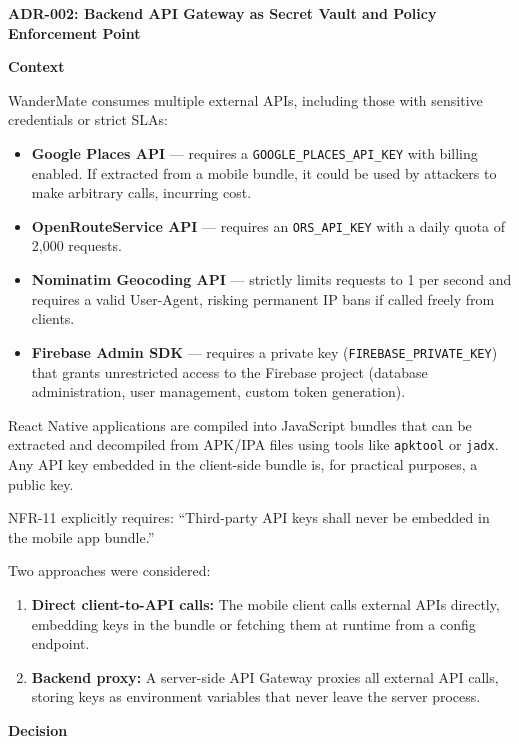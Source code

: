 \documentclass[12pt, a4paper]{article}
\newcommand{\code}[1]{\texttt{\small #1}}
\newcommand{\reqid}[1]{\textsc{\small #1}}
\begin{document}
\begin{tcolorbox}[adrbox]

\textbf{\large ADR-002: Backend API Gateway as Secret Vault and Policy Enforcement Point}

\vspace{0.6em}
\textbf{Context}

WanderMate consumes multiple external APIs, including those with sensitive credentials or strict SLAs:
\begin{itemize}
  \item \textbf{Google Places API} --- requires a \code{GOOGLE\_PLACES\_API\_KEY} with billing enabled. If extracted from a mobile bundle, it could be used by attackers to make arbitrary calls, incurring cost.
  \item \textbf{OpenRouteService API} --- requires an \code{ORS\_API\_KEY} with a daily quota of 2,000 requests.
  \item \textbf{Nominatim Geocoding API} --- strictly limits requests to 1 per second and requires a valid User-Agent, risking permanent IP bans if called freely from clients.
  \item \textbf{Firebase Admin SDK} --- requires a private key (\code{FIREBASE\_PRIVATE\_KEY}) that grants unrestricted access to the Firebase project (database administration, user management, custom token generation).
\end{itemize}

React Native applications are compiled into JavaScript bundles that can be extracted and decompiled from APK/IPA files using tools like \code{apktool} or \code{jadx}. Any API key embedded in the client-side bundle is, for practical purposes, a public key.

\reqid{NFR-11} explicitly requires: ``Third-party API keys shall never be embedded in the mobile app bundle.''

Two approaches were considered:
\begin{enumerate}
  \item \textbf{Direct client-to-API calls:} The mobile client calls external APIs directly, embedding keys in the bundle or fetching them at runtime from a config endpoint.
  \item \textbf{Backend proxy:} A server-side API Gateway proxies all external API calls, storing keys as environment variables that never leave the server process.
\end{enumerate}

\vspace{0.6em}
\textbf{Decision}


\end{tcolorbox}
\end{document}

